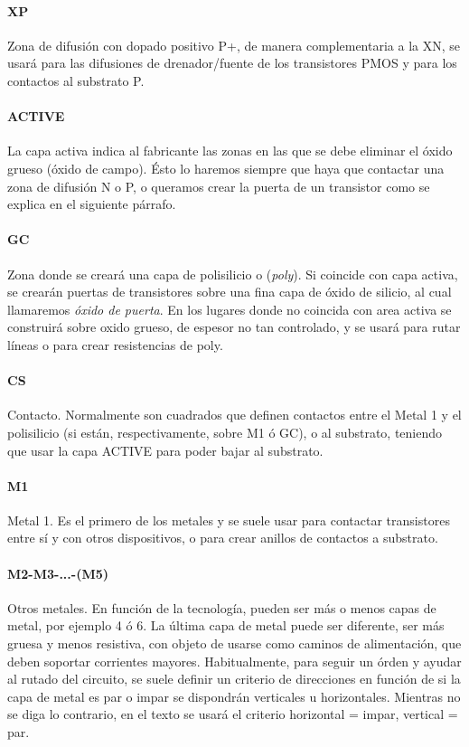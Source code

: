 \paragraph{XP}
Zona de difusión con dopado positivo P+, de manera complementaria a la XN,
se usará para las difusiones de drenador/fuente
de los transistores PMOS y para los contactos al substrato P.

\paragraph{ACTIVE}
La capa activa indica al fabricante las zonas en las que se debe eliminar el óxido grueso (óxido
de campo). Ésto lo haremos siempre que haya que contactar una zona de difusión N o P,
o queramos crear la puerta de un transistor como se explica en el siguiente párrafo.

\paragraph{GC}
Zona donde se creará una capa de polisilicio o (\textit{poly}). Si coincide con capa activa,
se crearán puertas de transistores sobre una fina capa de óxido de silicio,
al cual llamaremos \textit{óxido de puerta}.
En los lugares donde no coincida con area activa se construirá sobre oxido grueso,
de espesor no tan controlado, y se usará para rutar líneas o para crear resistencias
de poly.

\paragraph{CS}
Contacto. Normalmente son cuadrados que definen contactos entre el Metal 1 y el
polisilicio (si están, respectivamente, sobre M1 ó GC), o al substrato, teniendo que
usar la capa ACTIVE para poder bajar al substrato.

\paragraph{M1}
Metal 1. Es el primero de los metales y se suele usar para contactar
transistores entre sí y con otros dispositivos, o para crear anillos de contactos
a substrato.

\paragraph{M2-M3-...-(M5)}
Otros metales. En función de la tecnología, pueden ser
más o menos capas de metal, por ejemplo 4 ó 6. La última capa de metal puede ser
diferente, ser más gruesa y menos resistiva, con objeto de usarse como caminos de
alimentación, que deben soportar corrientes mayores. Habitualmente, para seguir un órden
y ayudar al rutado del circuito, se suele definir un criterio de direcciones
en función de si la capa de metal es par o impar se dispondrán verticales u
horizontales. Mientras no se diga lo contrario, en el texto se usará el criterio
horizontal = impar, vertical = par.

